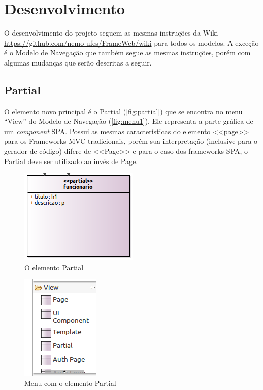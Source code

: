 \documentclass[
article,			%
11pt,				%
oneside,			%
a4paper,			%
english,			%
brazil,				%
sumario=tradicional
]{abntex2}
\begin{document}
\section{Desenvolvimento}
O desenvolvimento do projeto seguem as mesmas instruções da Wiki \url{https://github.com/nemo-ufes/FrameWeb/wiki} para todos os modelos. A exceção é o Modelo de Navegação que também segue as mesmas instruções, porém com algumas mudanças que serão descritas a seguir.
	
\subsection{Partial}

O elemento novo principal é o Partial (\autoref{fig:partial}) que se encontra no menu ``View'' do Modelo de Navegação (\autoref{fig:menu1}). Ele representa a parte gráfica de um \textit{component} SPA. Possui as mesmas características do elemento <<page>> para os Frameworks MVC tradicionais, porém sua interpretação (inclusive para o gerador de código) difere de <<Page>> e para o caso dos frameworks SPA, o Partial deve ser utilizado ao invés de Page.

\begin{figure}
	\centering
	\includegraphics[width=0.4\linewidth]{figuras/Partial}
	\caption{O elemento Partial}
	\label{fig:partial}
\end{figure}

\begin{figure}
	\centering
	\includegraphics[width=0.3\linewidth]{figuras/menu1}
	\caption{Menu com o elemento Partial}
	\label{fig:menu1}
\end{figure}
\end{document}
